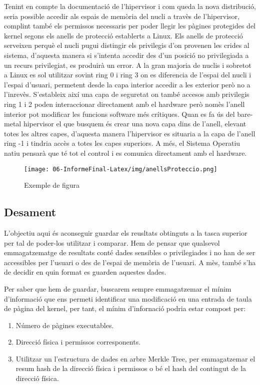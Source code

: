 ﻿\documentclass[10pt,a4paper,twocolumn,twoside]{article}
\begin{document}
Tenint en compte la documentació de l’hipervisor i com queda la nova distribució, seria possible accedir als espais de memòria del nucli a travès de l’hipervisor, complint també els permissos necessaris per poder llegir les pàgines protegides del kernel segons els anells de protecció establerts a Linux.
Els anells de protecció serveixen perquè el nucli pugui distingir els privilegis d’on provenen les crides al sistema, d’aquesta manera si s’intenta accedir des d’un posició no privilegiada a un recurs privilegiat, es produirà un error. A la gran majoria de nuclis i sobretot a Linux es sol utilitzar sovint ring 0 i ring 3 on es diferencia de l’espai del nucli i l’espai d’usuari, permetent desde la capa interior accedir a les exterior però no a l’inrevès. S’estableix així una capa de seguretat on també accesos amb privilegis ring 1 i 2 poden interaccionar directament amb el hardware però nomès l’anell interior pot modificar les funcions software més crítiques.
Quan es fa ús del bare-metal hipervisor el que busquem és crear una nova capa dins de l’anell, elevant totes les altres capes, d’aquesta manera l’hipervisor es situaria a la capa de l’anell ring -1 i tindria accès a totes les capes superiors. A més, el Sistema Operatiu natiu pensarà que té tot el control i es comunica directament amb el hardware.

\begin{figure}[!h]
\centering
	\texttt{[image: 06-InformeFinal-Latex/img/anellsProteccio.png]}
	\caption{Exemple de figura}
	\label{anellsProteccio}
\end{figure}

\subsection{Desament}
L’objectiu aqui és aconseguir guardar els reusltats obtinguts a la tasca superior per tal de poder-los utilitzar i comparar. Hem de pensar que qualsevol emmagatzematge de resultats conté dades sensibles o privilegiades i no han de ser accessibles per l’usuari o des de l’espai de memòria de l’usuari. A mès, també s’ha de decidir en quin format es guarden aquestes dades.

Per saber que hem de guardar, buscarem sempre emmagatzemar el mínim d’informació que ens permeti identificar una modificació en una entrada de taula de pàgina del kernel, per tant, el mínim d’infornació podria estar compost per:
\begin{enumerate}
\item Número de pàgines executables.
\item Direcció física i permissos corresponents.
\item Utilitzar un l’estructura de dades en arbre Merkle Tree, per emmagatzemar el resum hash de la direcció física i permissos o bé el hash del contingut de la direcció física.
\end{enumerate}
\end{document}
